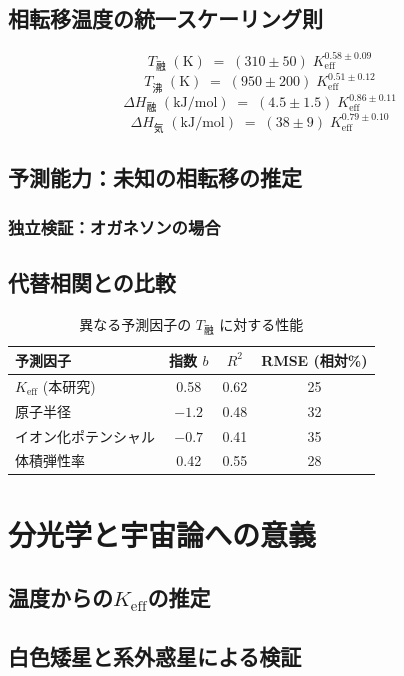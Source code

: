 \documentclass[11pt,a4paper]{article}
\newcommand{\Keff}{K_{\mathrm{eff}}}
\begin{document}
	\subsection{相転移温度の統一スケーリング則}
	\[
	\boxed{T_{\text{融}} \;(\mathrm{K}) \;=\; (310 \pm 50) \; \Keff^{0.58 \pm 0.09}}
	\]
	\[
	\boxed{T_{\text{沸}} \;(\mathrm{K}) \;=\; (950 \pm 200) \; \Keff^{0.51 \pm 0.12}}
	\]
	\[
	\boxed{\Delta H_{\text{融}} \;(\mathrm{kJ/mol}) \;=\; (4.5 \pm 1.5) \; \Keff^{0.86 \pm 0.11}}
	\]
	\[
	\boxed{\Delta H_{\text{気}} \;(\mathrm{kJ/mol}) \;=\; (38 \pm 9) \; \Keff^{0.79 \pm 0.10}}
	\]
	
	\subsection{予測能力：未知の相転移の推定}
	\subsubsection{独立検証：オガネソンの場合}
	\subsection{代替相関との比較}
	
	\begin{table}[htbp]
		\centering
		\caption{異なる予測因子の \(T_{\text{融}}\) に対する性能}
		\label{tab:comparison}
		\begin{tabular}{@{}lccc@{}}
			\toprule
			\textbf{予測因子} & \textbf{指数 }\(b\) & \textbf{\(R^2\)} & \textbf{RMSE (相対\%)} \\
			\midrule
			\(K_{\mathrm{eff}}\) (本研究) & 0.58 & 0.62 & 25 \\
			原子半径 & \(-1.2\) & 0.48 & 32 \\
			イオン化ポテンシャル & \(-0.7\) & 0.41 & 35 \\
			体積弾性率 & 0.42 & 0.55 & 28 \\
			\bottomrule
		\end{tabular}
	\end{table}
	
	\section{分光学と宇宙論への意義}
	\subsection{温度からの\(\Keff\)の推定}
	\subsection{白色矮星と系外惑星による検証}
\end{document}
